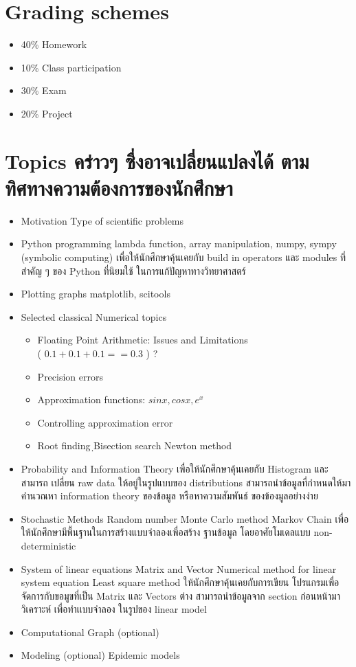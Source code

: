 \documentclass[12pt,a4paper]{article}
\begin{document}
\section{Grading schemes}
\begin{itemize}
	\item 40\%  Homework 
	\item 10\% Class participation
	\item 30\%  Exam
	\item 20\% Project 
\end{itemize}
\pagebreak
\section{Topics คร่าวๆ ซื่งอาจเปลี่ยนแปลงได้ ตามทิศทางความต้องการของนักศึกษา}
\begin{itemize}
	\item Motivation
	\subitem Type of scientific problems 
	\item Python programming
	\subitem lambda function, array manipulation, numpy, sympy (symbolic computing) 
	\subitem 
	เพื่อให้นักศึกษาคุ้นเคยกับ build in operators  และ modules ที่สำคัญ ๆ ของ Python ที่นิยมใช้ ในการแก้ปัญหาทางวิทยาศาสตร์ 
	\item Plotting graphs
	\subitem matplotlib, scitools
	\item Selected classical Numerical topics
	\begin{itemize}
		\item  Floating Point Arithmetic: Issues and Limitations \\ ( $0.1+0.1+0.1 == 0.3$ ) ? 
	
		\item Precision errors
		\item Approximation functions: $sin x , cos x, e^x  $
		\item Controlling approximation error
		\item Root finding 
			\subitem ฺBisection search
		\subitem Newton method 
	\end{itemize}
	\item Probability and Information Theory
	\subitem เพื่อให้นักศึกษาคุ้นเคยกับ Histogram และ สามารถ เปลี่ยน raw data ให้อยู่ในรูปแบบของ distributions  สามารถนำข้อมูลที่กำหนดให้มาคำนวณหา information theory ของข้อมูล หรือหาความสัมพันธ์ ของข้องมูลอย่างง่าย
	\item Stochastic Methods
	\subitem Random number
	\subitem Monte Carlo method
	\subitem Markov Chain
	\subitem เพื่อให้นักศึกษามีพื้นฐานในการสร้างแบบจำลองเพื่อสร้าง  ฐานข้อมูล  โดยอาศัยโมเดลแบบ non-deterministic 
	\item System of linear equations 
	\subitem Matrix and Vector
	\subitem Numerical method for linear system equation
	\subitem Least square method
	\subitem  ให้นักศึกษาคุ้นเคยกับการเขียน โปรแกรมเพื่อจัดการกับขอมูขที่เป็น Matrix และ Vectors ต่าง สามารถนำข้อมูลจาก section ก่อนหน้ามาวิเคราะห์ เพื่อทำเเบบจำลอง ในรูปของ linear model 
	\item Computational Graph (optional)
	\item Modeling (optional)
	\subitem Epidemic models
	

\end{itemize}
\end{document}
